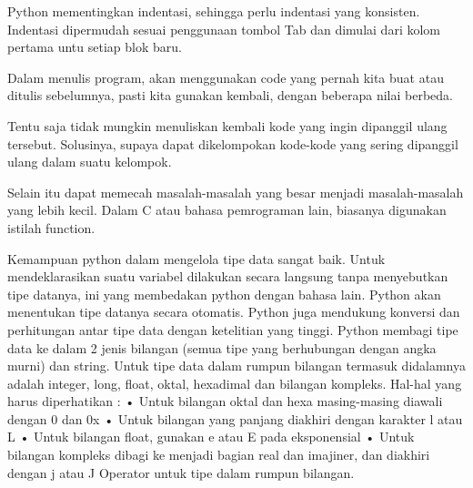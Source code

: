 Python mementingkan indentasi, sehingga perlu indentasi yang konsisten. Indentasi dipermudah sesuai penggunaan
tombol Tab dan dimulai dari kolom pertama untu setiap blok baru. 

Dalam menulis program, akan menggunakan code yang pernah kita  buat atau ditulis sebelumnya, pasti
kita gunakan kembali, dengan beberapa nilai berbeda.
 
Tentu saja tidak mungkin menuliskan kembali kode yang ingin dipanggil ulang tersebut.
Solusinya, supaya dapat dikelompokan kode-kode yang sering dipanggil ulang dalam suatu kelompok.

Selain itu dapat memecah masalah-masalah yang besar  menjadi masalah-masalah yang lebih kecil.
Dalam C atau bahasa pemrograman lain, biasanya digunakan istilah function.

Kemampuan python dalam mengelola tipe data sangat baik. Untuk mendeklarasikan suatu variabel dilakukan secara langsung tanpa menyebutkan tipe datanya, ini yang membedakan python dengan bahasa lain. Python akan menentukan tipe datanya secara otomatis. Python juga mendukung konversi dan perhitungan antar tipe data dengan ketelitian yang tinggi. Python membagi tipe data ke dalam 2 jenis bilangan (semua tipe yang berhubungan dengan angka murni) dan string. Untuk tipe data dalam rumpun bilangan termasuk didalamnya adalah integer, long, float, oktal, hexadimal dan bilangan kompleks. Hal-hal yang harus diperhatikan :
•	Untuk bilangan oktal dan hexa masing-masing diawali dengan 0 dan 0x
•	Untuk bilangan yang panjang diakhiri dengan karakter l atau L
•	Untuk bilangan float, gunakan e atau E pada eksponensial
•	Untuk bilangan kompleks dibagi ke menjadi bagian real dan imajiner, dan diakhiri dengan j atau J Operator untuk tipe dalam rumpun bilangan. \cite{utamipemrograman}
